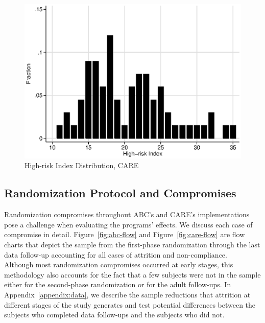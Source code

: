 \begin{center}
	\begin{figure}[H]
		\caption{High-risk Index Distribution, CARE} \label{figure:hridistcare}
		\centering
		\includegraphics[width=.95\columnwidth]{output/care_hri.eps}
	\end{figure}
\end{center}

\subsection{Randomization Protocol and Compromises} \label{appendix:randomization}

\noindent Randomization compromises throughout ABC's and CARE's implementations pose a challenge when evaluating the programs' effects. We discuss each case of compromise in detail. Figure~\ref{fig:abc-flow} and Figure~\ref{fig:care-flow} are flow charts that depict the sample from the first-phase randomization through the last data follow-up accounting for all cases of attrition and non-compliance.\\

\noindent Although most randomization compromises occurred at early stages, this methodology also accounts for the fact that a few subjects were not in the sample either for the second-phase randomization or for the adult follow-ups. In Appendix~\ref{appendix:data}, we describe the sample reductions that attrition at different stages of the study generates and test potential differences between the subjects who completed data follow-ups and the subjects who did not.\\

